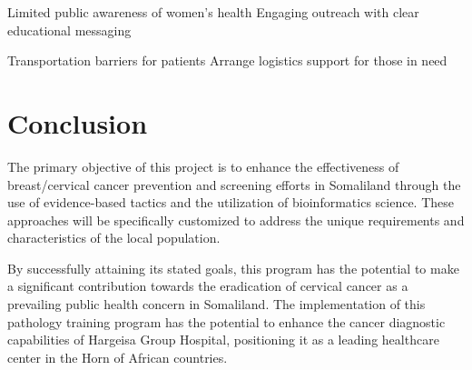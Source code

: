 \documentclass{article}
\begin{document}
\begin{outline}





\1 Limited public awareness of women's health
\2 Engaging outreach with clear educational messaging

\1 Transportation barriers for patients
\2 Arrange logistics support for those in need



\end{outline}




\section{Conclusion}
The primary objective of this project is to enhance the effectiveness of breast/cervical cancer prevention and screening efforts in Somaliland through the use of evidence-based tactics and the utilization of bioinformatics science. These approaches will be specifically customized to address the unique requirements and characteristics of the local population.


By successfully attaining its stated goals, this program has the potential to make a significant contribution towards the eradication of cervical cancer as a prevailing public health concern in Somaliland. The implementation of this pathology training program has the potential to enhance the cancer diagnostic capabilities of Hargeisa Group Hospital, positioning it as a leading healthcare center in the Horn of African countries.


\clearpage
\end{document}
